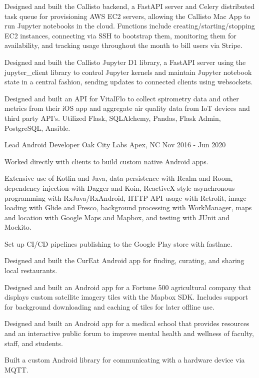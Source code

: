 \begin{cventries}
{\begin{cvitems}
        \item {Designed and built the Callisto backend, a FastAPI server and Celery distributed task queue for provisioning AWS EC2 servers, allowing the Callisto Mac App to run Jupyter notebooks in the cloud. Functions include creating/starting/stopping EC2 instances, connecting via SSH to bootstrap them, monitoring them for availability, and tracking usage throughout the month to bill users via Stripe.}
        \item {Designed and built the Callisto Jupyter D1 library, a FastAPI server using the jupyter\_client library to control Jupyter kernels and maintain Jupyter notebook state in a central fashion, sending updates to connected clients using websockets.}
        \item {Designed and built an API for VitalFlo to collect spirometry data and other metrics from their iOS app and aggregate air quality data from IoT devices and third party API's. Utilized Flask, SQLAlchemy, Pandas, Flask Admin, PostgreSQL, Ansible.}
      \end{cvitems}
    }

  \cventry
    {Lead Android Developer} %
    {Oak City Labs} %
    {Apex, NC} %
    {Nov 2016 - Jun 2020} %
    {
      \begin{cvitems} %
        \item {Worked directly with clients to build custom native Android apps.}
        \item {Extensive use of Kotlin and Java, data persistence with Realm and Room, dependency injection with Dagger and Koin, ReactiveX style asynchronous programming with RxJava/RxAndroid, HTTP API usage with Retrofit, image loading with Glide and Fresco, background processing with WorkManager, maps and location with Google Maps and Mapbox, and testing with JUnit and Mockito.}
        \item {Set up CI/CD pipelines publishing to the Google Play store with fastlane.}
        \item {Designed and built the CurEat Android app for finding, curating, and sharing local restaurants.}
        \item {Designed and built an Android app for a Fortune 500 agricultural company that displays custom satellite imagery tiles with the Mapbox SDK. Includes support for background downloading and caching of tiles for later offline use.}
        \item {Designed and built an Android app for a medical school that provides resources and an interactive public forum to improve mental health and wellness of faculty, staff, and students.}
        \item {Built a custom Android library for communicating with a hardware device via MQTT.}
      \end{cvitems}
    }


\end{cventries}

